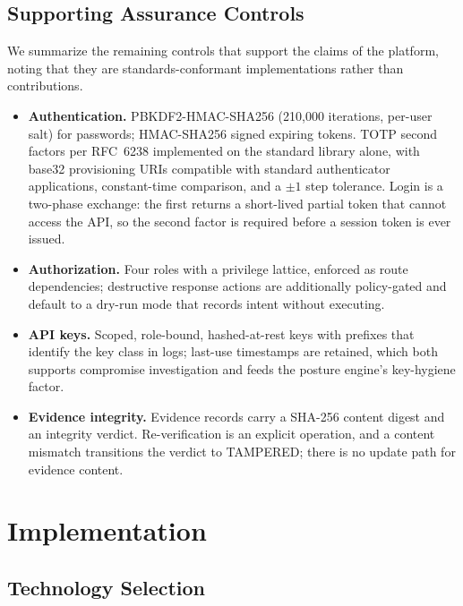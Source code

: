 \documentclass[conference]{IEEEtran}
\begin{document}
\subsection{Supporting Assurance Controls}

We summarize the remaining controls that support the claims of the platform,
noting that they are standards-conformant implementations rather than
contributions.

\begin{itemize}
\item \textbf{Authentication.} PBKDF2-HMAC-SHA256 (210{,}000 iterations,
      per-user salt) for passwords; HMAC-SHA256 signed expiring tokens.
      TOTP second factors per RFC~6238 \cite{rfc6238} implemented on the
      standard library alone, with base32 provisioning URIs compatible with
      standard authenticator applications, constant-time comparison, and a
      $\pm 1$ step tolerance. Login is a two-phase exchange: the first
      returns a short-lived partial token that cannot access the API, so the
      second factor is required before a session token is ever issued.
\item \textbf{Authorization.} Four roles with a privilege lattice, enforced
      as route dependencies; destructive response actions are additionally
      policy-gated and default to a dry-run mode that records intent without
      executing.
\item \textbf{API keys.} Scoped, role-bound, hashed-at-rest keys with
      prefixes that identify the key class in logs; last-use timestamps are
      retained, which both supports compromise investigation and feeds the
      posture engine's key-hygiene factor.
\item \textbf{Evidence integrity.} Evidence records carry a SHA-256 content
      digest and an integrity verdict. Re-verification is an explicit
      operation, and a content mismatch transitions the verdict to
      TAMPERED; there is no update path for evidence content.
\end{itemize}

\section{Implementation}

\subsection{Technology Selection}
\end{document}

